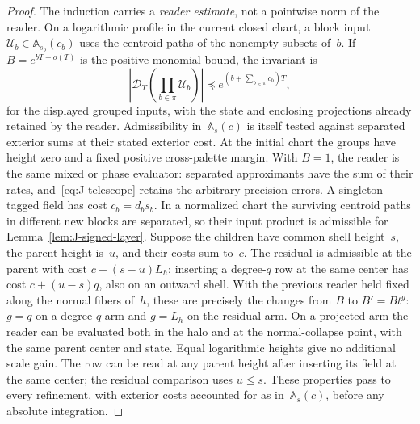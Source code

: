 \begin{proof}
The induction carries a \emph{reader estimate}, not a pointwise norm of the reader. On a logarithmic profile in the current closed chart, a block input $\mathcal U_b\in\mathbb A_{s_b}(c_b)$ uses the centroid paths of the nonempty subsets of~$b$. If $B=e^{bT+o(T)}$ is the positive monomial bound, the invariant is
\begin{equation}\label{eq:J-reader-profile}
 \left|\mathcal D_T\!\left(\prod_{b\in\pi}\mathcal U_b\right)\right|
 \preccurlyeq e^{(b+\sum_{b\in\pi}c_b)T},
\end{equation}
for the displayed grouped inputs, with the state and enclosing projections already retained by the reader. Admissibility in~$\mathbb A_s(c)$ is itself tested against separated exterior sums at their stated exterior cost. At the initial chart the groups have height zero and a fixed positive cross-palette margin. With $B=1$, the reader is the same mixed or phase evaluator: separated approximants have the sum of their rates, and~\eqref{eq:J-telescope} retains the arbitrary-precision errors. A singleton tagged field has cost $c_b=d_bs_b$. In a normalized chart the surviving centroid paths in different new blocks are separated, so their input product is admissible for Lemma~\ref{lem:J-signed-layer}. Suppose the children have common shell height~$s$, the parent height is~$u$, and their costs sum to~$c$. The residual is admissible at the parent with cost $c-(s-u)L_h$; inserting a degree-$q$ row at the same center has cost $c+(u-s)q$, also on an outward shell. With the previous reader held fixed along the normal fibers of~$h$, these are precisely the changes from $B$ to $B'=Bt^g$: $g=q$ on a degree-$q$ arm and $g=L_h$ on the residual arm. On a projected arm the reader can be evaluated both in the halo and at the normal-collapse point, with the same parent center and state. Equal logarithmic heights give no additional scale gain. The row can be read at any parent height after inserting its field at the same center; the residual comparison uses $u\le s$. These properties pass to every refinement, with exterior costs accounted for as in~$\mathbb A_s(c)$, before any absolute integration.


\end{proof}
